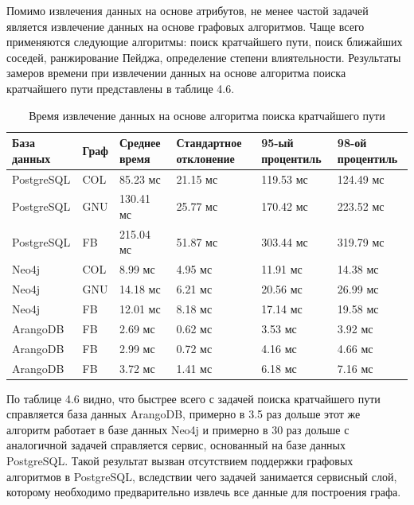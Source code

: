 Помимо извлечения данных на основе атрибутов, не менее частой задачей является извлечение данных на основе графовых алгоритмов. Чаще всего применяются следующие алгоритмы: поиск кратчайшего пути, поиск ближайших соседей, ранжирование Пейджа, определение степени влиятельности. Результаты замеров времени при извлечении данных на основе алгоритма поиска кратчайшего пути представлены в таблице 4.6.

\begin{table} [htbp]
    \centering\small
    \caption{Время извлечение данных на основе алгоритма поиска кратчайшего пути}
    \begin{tabular}{|p{3cm}|p{1cm}|p{2cm}|p{2cm}|p{2cm}|p{2cm}|}
        \hline
        База данных & Граф & Среднее время & Стандартное отклонение & 95-ый процентиль & 98-ой процентиль \\ \hline
        PostgreSQL  & COL  & 85.23 мс      & 21.15 мс               & 119.53 мс        & 124.49 мс        \\ \hline
        PostgreSQL  & GNU  & 130.41 мс     & 25.77 мс               & 170.42 мс        & 223.52 мс        \\ \hline
        PostgreSQL  & FB   & 215.04 мс     & 51.87 мс               & 303.44 мс        & 319.79 мс        \\ \hline
        Neo4j       & COL  & 8.99 мс       & 4.95 мс                & 11.91 мс         & 14.38 мс         \\ \hline
        Neo4j       & GNU  & 14.18 мс      & 6.21 мс                & 20.56 мс         & 26.99 мс         \\ \hline
        Neo4j       & FB   & 12.01 мс      & 8.18 мс                & 17.14 мс         & 19.58 мс         \\ \hline
        ArangoDB    & FB   & 2.69 мс       & 0.62 мс                & 3.53 мс          & 3.92 мс          \\ \hline
        ArangoDB    & FB   & 2.99 мс       & 0.72 мс                & 4.16 мс          & 4.66 мс          \\ \hline
        ArangoDB    & FB   & 3.72 мс       & 1.41 мс                & 6.18 мс          & 7.16 мс          \\ \hline
    \end{tabular}
    \normalsize
\end{table}

По таблице 4.6 видно, что быстрее всего с задачей поиска кратчайшего пути справляется база данных ArangoDB, примерно в 3.5 раз дольше этот же алгоритм работает в базе данных Neo4j и примерно в 30 раз дольше с аналогичной задачей справляется сервис, основанный на базе данных PostgreSQL. Такой результат вызван отсутствием поддержки графовых алгоритмов в PostgreSQL, вследствии чего задачей занимается сервисный слой, которому необходимо предварительно извлечь все данные для построения графа.

